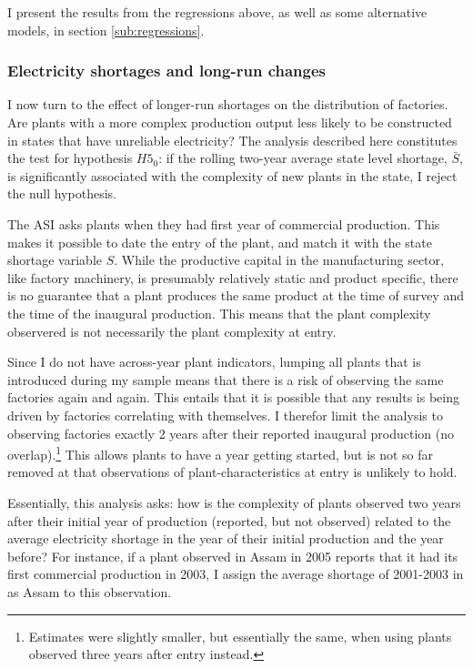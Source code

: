 \documentclass[11pt]{article}
\begin{document}
I present the results from the regressions above, as well as some alternative models, in section \ref{sub:regressions}.

\subsubsection{Electricity shortages and long-run changes}\label{sub:entry_emp_strat}

I now turn to the effect of longer-run shortages on the distribution of factories. Are plants with a more complex production output less likely to be constructed in states that have unreliable electricity? The analysis described here constitutes the test for hypothesis $H5_0$: if the rolling two-year average state level shortage, $\bar{S}$, is significantly associated with the complexity of new plants in the state, I reject the null hypothesis. 

The ASI asks plants when they had first year of commercial production. This makes it possible to date the entry of the plant, and match it with the state shortage variable $S$. While the productive capital in the manufacturing sector, like factory machinery, is presumably relatively static and product specific, there is no guarantee that a plant produces the same product at the time of survey and the time of the inaugural production. This means that the plant complexity observered is not necessarily the plant complexity at entry. 

Since I do not have across-year plant indicators, lumping all plants that is introduced during my sample means that there is a risk of observing the same factories again and again. This entails that it is possible that any results is being driven by factories correlating with themselves. I therefor limit the analysis to observing factories exactly 2 years after their reported inaugural production (no overlap).\footnote{Estimates were slightly smaller, but essentially the same, when using plants observed three years after entry instead.} This allows plants to have a year getting started, but is not so far removed at that observations of plant-characteristics at entry is unlikely to hold.

Essentially, this analysis asks: how is the complexity of plants observed two years after their initial year of production (reported, but not observed) related to the average electricity shortage in the year of their initial production and the year before? For instance, if a plant observed in Assam in 2005 reports that it had its first commercial production in 2003, I assign the average shortage of 2001-2003 in as Assam to this observation. 
\end{document}
